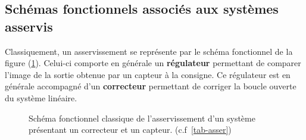 \subsection{Schémas fonctionnels associés aux systèmes asservis}

Classiquement, un asservissement se représente par le schéma fonctionnel de 
la figure (\cref{fig-reg}). Celui-ci comporte en générale un \textbf{régulateur}
permettant de comparer l'image de la sortie obtenue par un capteur à la consigne.
Ce régulateur est en générale accompagné d'un \textbf{correcteur} permettant de corriger
la boucle ouverte du système linéaire.

\begin{figure}[!h]
\centering
%                                      
\caption{Schéma fonctionnel classique de l'asservissement d'un système 
         présentant un correcteur et un capteur. (c.f~\cref{tab-asser})
         \label{fig-reg}}
\end{figure}


